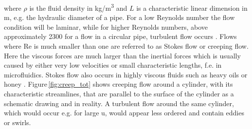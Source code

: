 where $\rho$ is the fluid density in kg/m\textsuperscript{3} and $L$ is a characteristic linear dimension in m, e.g. the hydraulic diameter of a pipe. For a low Reynolds number the flow condition will be laminar, while for higher Reynolds numbers, above approximately 2300 for a flow in a circular pipe, turbulent flow occurs \cite{schwarze2012cfd}. Flows where Re is much smaller than one are referred to as Stokes flow or creeping flow. Here the viscous forces are much larger than the inertial forces which is usually caused by either very low velocities or small characteristic lengths, f.e. in microfluidics. Stokes flow also occurs in highly viscous fluids such as heavy oils or honey \cite{lautrup2004physics}. Figure\,\ref{fig:creep_tot} shows creeping flow around a cylinder, with its characteristic streamlines, that are parallel to the surface of the cylinder as a schematic drawing and in reality. A turbulent flow around the same cylinder, which would occur e.g. for large u, would appear less ordered and contain eddies or swirls.
